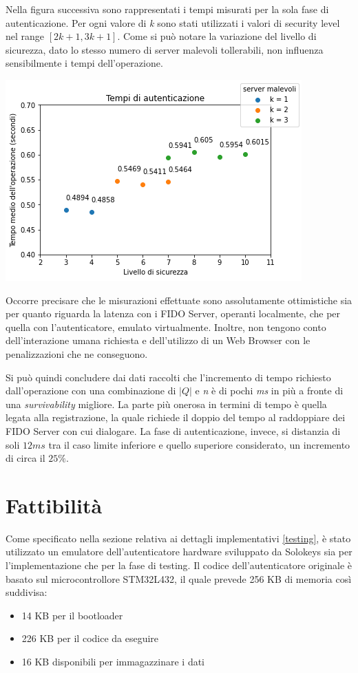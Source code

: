 Nella figura successiva sono rappresentati i tempi misurati per la sola fase di autenticazione. Per ogni valore di \emph{k} sono stati utilizzati i valori di security level nel range $[2k+1, 3k+1]$. Come si può notare la variazione del livello di sicurezza, dato lo stesso numero di server malevoli tollerabili, non influenza sensibilmente i tempi dell'operazione.
\begin{center}
	\includegraphics[scale=0.65]{figures/auth_results}
\end{center}

Occorre precisare che le misurazioni effettuate sono assolutamente ottimistiche sia per quanto riguarda la latenza con i FIDO Server, operanti localmente, che per quella con l'autenticatore, emulato virtualmente. Inoltre, non tengono conto dell'interazione umana richiesta e dell'utilizzo di un Web Browser con le penalizzazioni che ne conseguono. 

Si può quindi concludere dai dati raccolti che l'incremento di tempo richiesto dall'operazione con una combinazione di $|Q|$ e \emph{n} è di pochi \emph{ms} in più a fronte di una \emph{survivability} migliore. La parte più onerosa in termini di tempo è quella legata alla registrazione, la quale richiede il doppio del tempo al raddoppiare dei FIDO Server con cui dialogare. La fase di autenticazione, invece, si distanzia di soli $12 ms$ tra il caso limite inferiore e quello superiore considerato, un incremento di circa il $25\%$.

\section{Fattibilità}
\label{fattibilità}

Come specificato nella sezione relativa ai dettagli implementativi \ref{testing}, è stato utilizzato un emulatore dell'autenticatore hardware sviluppato da Solokeys sia per l'implementazione che per la fase di testing. Il codice dell'autenticatore originale è basato sul microcontrollore STM32L432, il quale prevede 256 KB di memoria così suddivisa:
\begin{itemize}
	\item 14 KB per il bootloader
	\item 226 KB per il codice da eseguire
	\item 16 KB disponibili per immagazzinare i dati
\end{itemize}

